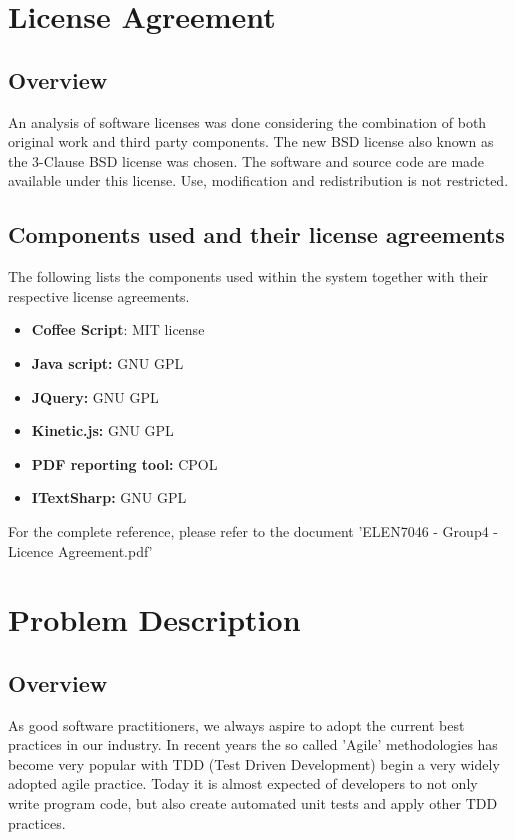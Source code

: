 \documentclass[a4paper,12pt]{Article}
\begin{document}
\section{License Agreement}
\subsection{Overview}
An analysis of software licenses was done considering the combination of both original work and third party components. The new BSD license also known as the 3-Clause BSD\cite{bds} license was chosen. The software and source code are made available under this license. Use, modification and redistribution is not restricted. 
\subsection{Components used and their license agreements}
The following lists the components used within the system together with their respective license agreements.
\begin{itemize}
\item \textbf{Coffee Script}: MIT license\cite{mit}
\item \textbf{Java script:} GNU GPL\cite{gnugpl}
\item \textbf{JQuery:} GNU GPL\cite{gnugpl}
\item \textbf{Kinetic.js:} GNU GPL\cite{gnugpl}
\item \textbf{PDF reporting tool:} CPOL\cite{cpol}
\item \textbf{ITextSharp:} GNU GPL\cite{gnugpl}
\end{itemize}

For the complete reference, please refer to the document 'ELEN7046 - Group4 - Licence Agreement.pdf'\cite{licenceDoc}


\section{Problem Description}
\subsection{Overview}
As good software practitioners, we always aspire to adopt the current best practices in our industry. In recent years the so called 'Agile' methodologies has become very popular with TDD\cite{tdd} (Test Driven Development) begin a very widely adopted agile practice. Today it is almost expected of developers to not only write program code, but also create automated unit tests and apply other TDD practices.
\end{document}

